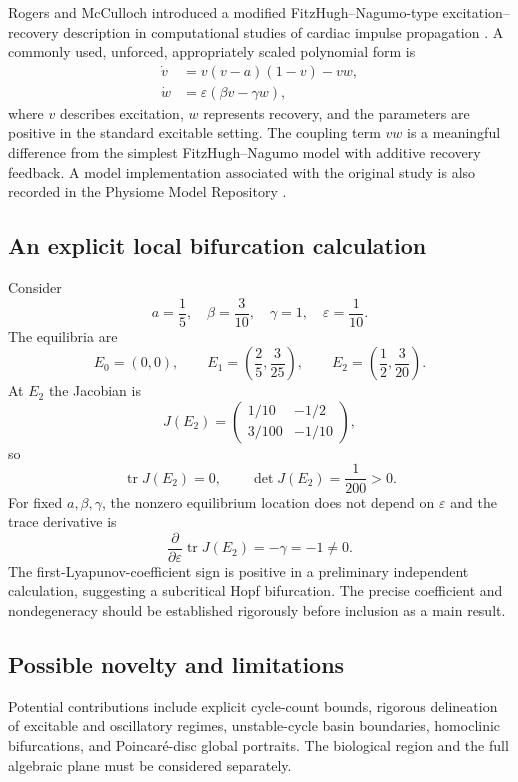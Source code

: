 \documentclass[11pt,a4paper]{article}
\begin{document}
Rogers and McCulloch introduced a modified FitzHugh--Nagumo-type excitation--recovery description in computational studies of cardiac impulse propagation \cite{RogersMcCulloch1994}. A commonly used, unforced, appropriately scaled polynomial form is
\begin{equation}
\boxed{\begin{aligned}
\dot v &=v(v-a)(1-v)-vw,\\
\dot w &=\varepsilon(\beta v-\gamma w),
\end{aligned}}
\label{eq:rm}
\end{equation}
where $v$ describes excitation, $w$ represents recovery, and the parameters are positive in the standard excitable setting. The coupling term $vw$ is a meaningful difference from the simplest FitzHugh--Nagumo model with additive recovery feedback. A model implementation associated with the original study is also recorded in the Physiome Model Repository \cite{PhysiomeRM}.

\subsection{An explicit local bifurcation calculation}

Consider
\[
a=\frac15,\quad
\beta=\frac3{10},\quad
\gamma=1,\quad
\varepsilon=\frac1{10}.
\]
The equilibria are
\[
E_0=(0,0),\qquad
E_1=\left(\frac25,\frac3{25}\right),\qquad
E_2=\left(\frac12,\frac3{20}\right).
\]
At $E_2$ the Jacobian is
\[
J(E_2)=\begin{pmatrix}
 1/10 & -1/2\\
 3/100 & -1/10
\end{pmatrix},
\]
so
\[
\operatorname{tr}J(E_2)=0,\qquad
\det J(E_2)=\frac1{200}>0.
\]
For fixed $a,\beta,\gamma$, the nonzero equilibrium location does not depend on $\varepsilon$ and the trace derivative is
\[
\frac{\partial}{\partial\varepsilon}\operatorname{tr}J(E_2)=-\gamma=-1\ne0.
\]
The first-Lyapunov-coefficient sign is positive in a preliminary independent calculation, suggesting a subcritical Hopf bifurcation. The precise coefficient and nondegeneracy should be established rigorously before inclusion as a main result.

\subsection{Possible novelty and limitations}

Potential contributions include explicit cycle-count bounds, rigorous delineation of excitable and oscillatory regimes, unstable-cycle basin boundaries, homoclinic bifurcations, and Poincar\'e-disc global portraits. The biological region and the full algebraic plane must be considered separately.
\end{document}

